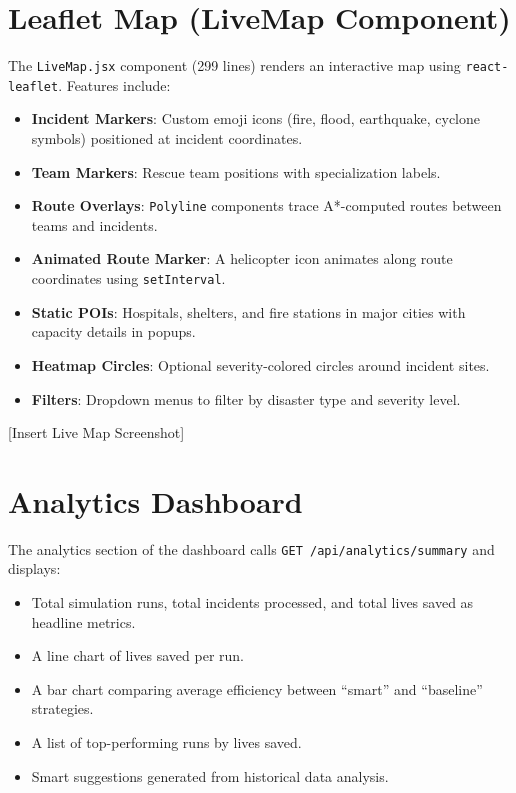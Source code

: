 \section{Leaflet Map (LiveMap Component)}
\label{sec:impl_map}

The \texttt{LiveMap.jsx} component (299 lines) renders an interactive map using \texttt{react-leaflet}. Features include:

\begin{itemize}[leftmargin=*]
    \item \textbf{Incident Markers}: Custom emoji icons (fire, flood, earthquake, cyclone symbols) positioned at incident coordinates.
    \item \textbf{Team Markers}: Rescue team positions with specialization labels.
    \item \textbf{Route Overlays}: \texttt{Polyline} components trace A*-computed routes between teams and incidents.
    \item \textbf{Animated Route Marker}: A helicopter icon animates along route coordinates using \texttt{setInterval}.
    \item \textbf{Static POIs}: Hospitals, shelters, and fire stations in major cities with capacity details in popups.
    \item \textbf{Heatmap Circles}: Optional severity-colored circles around incident sites.
    \item \textbf{Filters}: Dropdown menus to filter by disaster type and severity level.
\end{itemize}

[Insert Live Map Screenshot]

\section{Analytics Dashboard}
\label{sec:impl_analytics}

The analytics section of the dashboard calls \texttt{GET /api/analytics/summary} and displays:

\begin{itemize}[leftmargin=*]
    \item Total simulation runs, total incidents processed, and total lives saved as headline metrics.
    \item A line chart of lives saved per run.
    \item A bar chart comparing average efficiency between ``smart'' and ``baseline'' strategies.
    \item A list of top-performing runs by lives saved.
    \item Smart suggestions generated from historical data analysis.
\end{itemize}

